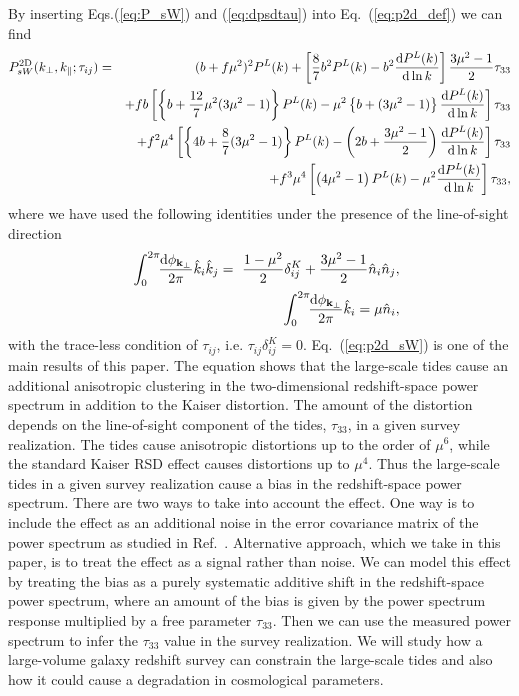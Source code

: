 \documentclass[prd,onecolumn,notitlepage,amsmath,amssymb,floatfix,superscriptaddress]{revtex4-1}
\newcommand{\bk}{{\bf k}}
\newcommand{\hk}{\hat{k}}
\begin{document}
By inserting Eqs.(\ref{eq:P_sW}) and (\ref{eq:dpsdtau}) into Eq.~(\ref{eq:p2d_def}) we can find
%
\begin{eqnarray}
P^{\rm 2D}_{sW}(k_\perp,k_\parallel; \tau_{ij})&=& (b+f\mu^2)^2P^L(k)+
\left[\frac{8}{7}b^2 P^L(k)-b^2\frac{\mathrm{d}P^L(k)}{\mathrm{d}\ln k}\right]\frac{3\mu^2-1}{2}\tau_{33}
\nonumber\\
&&+fb\left[\left\{b+ \frac{12}{7}\mu^2 (3\mu^2-1)\right\}P^L(k)
-\mu^2\left\{b+(3\mu^2-1)\right\}\frac{\mathrm{d}P^L(k)}{\mathrm{d}\ln k}\right]\tau_{33}
\nonumber\\
&&+f^2\mu^4\left[
\left\{4b+\frac{8}{7}(3\mu^2-1)\right\}P^L(k)
-\left(2b+\frac{3\mu^2-1}{2}\right)\frac{\mathrm{d}P^L(k)}{\mathrm{d}\ln k}\right] \tau_{33}
\nonumber\\
&&+f^3\mu^4\left[
\left(4\mu^2-1\right)P^L(k)
-\mu^2\frac{\mathrm{d}P^L(k)}{\mathrm{d}\ln k}
\right]\tau_{33},
\label{eq:p2d_sW}
\end{eqnarray}
%
where we have used the following identities under the presence of the line-of-sight direction
%
\begin{eqnarray}
&&\int_0^{2\pi}\!\!\frac{\mathrm{d}\phi_{\bk_\perp}}{2\pi} \hk_i\hk_j  =
\ \frac{1-\mu^2}{2}\delta_{ij}^K
+\frac{3\mu^2-1}{2}\hat{n}_i\hat{n}_j, \nonumber \\
&&\int_0^{2\pi}\!\!\frac{\mathrm{d}\phi_{\bk_\perp}}{2\pi} \hk_i
=\mu \hat{n}_i,
\end{eqnarray}
%
with the trace-less condition of $\tau_{ij}$, i.e. $\tau_{ij}\delta_{ij}^K=0$.
Eq.~(\ref{eq:p2d_sW}) is one of the main results of this paper. The equation shows that the large-scale tides
cause an additional anisotropic clustering in the two-dimensional redshift-space power spectrum in addition to the 
Kaiser distortion. 
The amount of the 
distortion depends on the 
line-of-sight component of the tides, $\tau_{33}$, in a given survey realization. The tides cause 
anisotropic distortions up to the order of $\mu^6$, while the standard Kaiser RSD effect causes distortions up to 
$\mu^4$. 
Thus the large-scale tides in a given survey realization 
cause a bias in the redshift-space power spectrum. There are two ways to take into account 
the effect. One way is to include the effect as an additional noise in the error covariance matrix of the 
power spectrum as studied in Ref.~\cite{Akitsuetal:17}. Alternative approach, which we take in this paper, 
is to treat the effect as a signal rather than noise. We can model this effect by treating the bias 
as a purely systematic additive shift in the redshift-space power spectrum, where an amount of the bias is 
given by the power spectrum response multiplied by a free parameter $\tau_{33}$. Then we can use 
the measured power spectrum to infer the $\tau_{33}$ value in the survey realization. We will study how a large-volume galaxy redshift survey can constrain the large-scale tides and also how it could cause a degradation in cosmological parameters.
\end{document}
